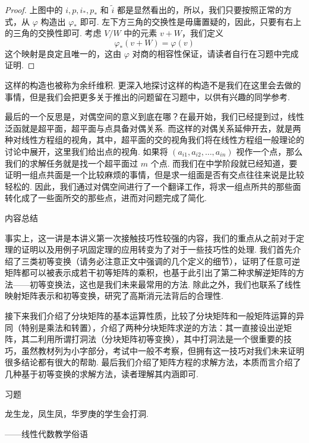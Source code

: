 \begin{proof}
    上图中的 $i, p, i_*, p_*$ 和 $\tilde{i}$ 都是显然看出的，所以，我们只要按照正常的方式，从 $\varphi$ 构造出 $\varphi_*$ 即可. 左下方三角的交换性是毋庸置疑的，因此，只要有右上的三角的交换性即可. 考虑 $V/W$ 中的元素 $v + W$，我们定义
    \[
    \varphi_*(v + W) = \varphi(v)
    \]
    这个映射是良定且唯一的，这由 $\varphi$ 对商的相容性保证，请读者自行在习题中完成证明.
\end{proof}

这样的构造也被称为余纤维积. 更深入地探讨这样的构造不是我们在这里会去做的事情，但是我们会把更多关于推出的问题留在习题中，以供有兴趣的同学参考.

最后的一个反思是，对偶空间的意义到底在哪？在最开始，我们已经提到过，线性泛函就是超平面，超平面与点具备对偶关系. 而这样的对偶关系延伸开去，就是两种对线性方程组的视角，其中，超平面的交的视角我们将在线性方程组一般理论的讨论中展开，这里我们给出点的视角. 如果将 $(a_{i1}, a_{i2},\ldots, a_{in})$ 视作一个点，那么我们的求解任务就是找一个超平面过 $m$ 个点. 而我们在中学阶段就已经知道，要证明一组点共面是一个比较麻烦的事情，但是求一组面是否有交点往往来说是比较轻松的. 因此，我们通过对偶空间进行了一个翻译工作，将求一组点所共的那些面转化成了一些面所交的那些点，进而对问题完成了简化.

\vspace{2ex}
\centerline{\heiti \Large 内容总结}

事实上，这一讲是本讲义第一次接触技巧性较强的内容，我们的重点从之前对于定理的证明以及用例子巩固定理的应用转变为了对于一些技巧性的处理. 我们首先介绍了三类初等变换（请务必注意正文中强调的几个定义的细节），证明了任意可逆矩阵都可以被表示成若干初等矩阵的乘积，也基于此引出了第二种求解逆矩阵的方法——初等变换法，这也是我们未来最常用的方法. 除此之外，我们也联系了线性映射矩阵表示和初等变换，研究了高斯消元法背后的合理性.

接下来我们介绍了分块矩阵的基本运算性质，比较了分块矩阵和一般矩阵运算的异同（特别是乘法和转置），介绍了两种分块矩阵求逆的方法：其一直接设出逆矩阵，其二利用所谓打洞法（分块矩阵初等变换），其中打洞法是一个很重要的技巧，虽然教材列为小字部分，考试中一般不考察，但拥有这一技巧对我们未来证明很多结论都有很大的帮助. 最后我们介绍了矩阵方程的求解方法，本质而言介绍了几种基于初等变换的求解方法，读者理解其内涵即可.

\vspace{2ex}
\centerline{\heiti \Large 习题}

\vspace{2ex}
{\kaishu 龙生龙，凤生凤，华罗庚的学生会打洞.}
\begin{flushright}
    \kaishu
    ——线性代数教学俗语
\end{flushright}

